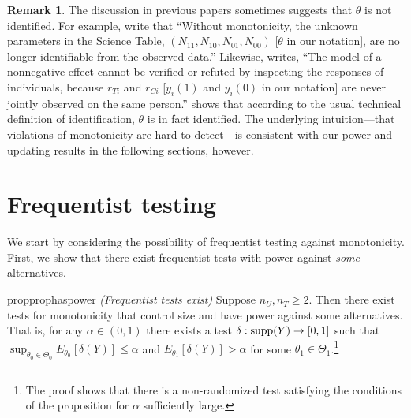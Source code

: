 \documentclass[12pt,reqno]{amsart}
\theoremstyle{theorem}
\theoremstyle{definition}
\newtheorem{rem}{Remark}
\newcommand{\0}{\mathbf{0}}
\newcommand{\1}{\mathbf{1}}
\begin{document}
\begin{rem}
The discussion in previous papers sometimes suggests that $\theta$ is
not identified. For example, \citet{ding_model-free_2019} write that ``Without
monotonicity, the unknown parameters in the Science Table, $(N_{11}, N_{10}, N_{01},
N_{00})$ [$\theta$ in our notation], are no longer identifiable from the observed data.''
Likewise, \citet{rosenbaum_effects_2001} writes, ``The model of a nonnegative effect
cannot be verified or refuted by inspecting the responses of individuals, because $r_{Ti}$
and $r_{Ci}$ [$y_i(1)$ and $y_i(0)$ in our notation] are never jointly observed on the
same person.''  shows that according to the usual technical definition of
identification, $\theta$ is in fact identified. The underlying intuition---that violations of monotonicity are hard to detect---is consistent with our power and updating results in the following sections, however.
\end{rem}

\section{Frequentist testing}

We start by considering the possibility of frequentist testing against monotonicity. First,
we show that there exist frequentist tests with power against \emph{some} alternatives.

\begin{restatable}{prop}{prophaspower}
\label{prop:haspower}
\emph{(Frequentist tests exist)}
Suppose $n_U,n_T \geq 2$. Then there exist tests for monotonicity that control size and have power against some alternatives. That is, for any $\alpha \in (0,1)$ there exists a test $\delta: \operatorname{supp}(Y) \to [0,1]$ such that $\sup_{\theta_0 \in \Theta_0} E_{\theta_0}[\delta(Y)] \leq \alpha$ and $E_{\theta_1}[\delta(Y)] > \alpha$ for some $\theta_1 \in \Theta_1$.\footnote{The proof shows that there is a non-randomized test satisfying the conditions of the proposition for $\alpha$ sufficiently large.}      
\end{restatable}
\end{document}
